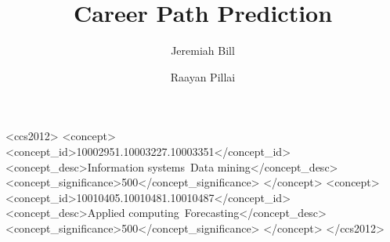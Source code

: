 \documentclass[format=acmsmall, review=false, screen=true]{acmart}
\begin{document}
\title{Career Path Prediction}

\author{Jeremiah Bill}

\author{Raayan Pillai}


  


%
%
\begin{CCSXML}
	<ccs2012>
		<concept>
			<concept_id>10002951.10003227.10003351</concept_id>
			<concept_desc>Information systems~Data mining</concept_desc>
			<concept_significance>500</concept_significance>
		</concept>
		<concept>
			<concept_id>10010405.10010481.10010487</concept_id>
			<concept_desc>Applied computing~Forecasting</concept_desc>
			<concept_significance>500</concept_significance>
		</concept>
	</ccs2012>
\end{CCSXML}


%
%






\maketitle

\renewcommand{\shortauthors}{J. Bill et al.}


\end{document}
